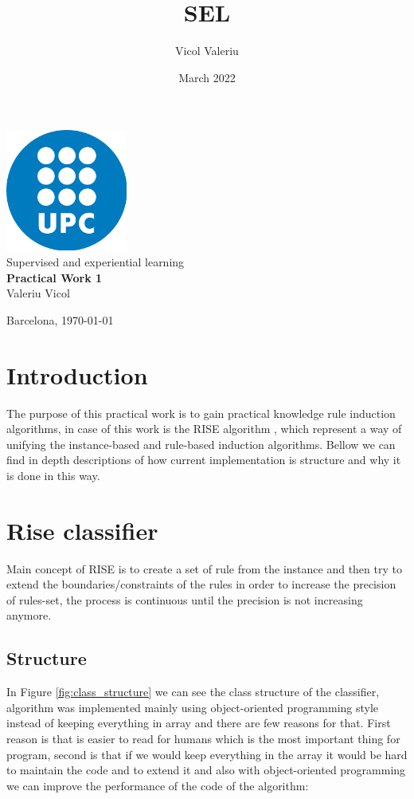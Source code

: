 \documentclass{article}
\title{SEL}
\author{Vicol Valeriu}
\date{March 2022}
\begin{document}
% 

\begin{titlepage}
    \centering
   \sc \LARGE
   \vspace{3cm}
   \includegraphics[height=4cm,width=4cm]{media/logo.png}\\
   \vspace{1cm}
   Supervised and experiential learning\\ 

   \vfill
   \textbf{Practical Work 1}\\

   \vspace{2cm}
   \Large \vfill
   Valeriu Vicol 
   
   \vfill
 
  Barcelona, \today
\end{titlepage}
\thispagestyle{empty}
\tableofcontents
\vfill
\vspace{.75cm}
\setcounter{page}{1}
\newpage
\section{Introduction}
The purpose of this practical work is to gain practical knowledge  rule induction algorithms, in case of this work is the RISE
algorithm \cite{domingos1996unifying}, which represent a way of unifying the instance-based and rule-based induction
algorithms. Bellow we can find in depth descriptions of how current implementation is structure and why it is done in this way.
\section{Rise classifier}
Main concept of RISE is to create a set of rule from the instance and then try to extend the boundaries/constraints of the rules
in order to increase the precision of rules-set, the process is continuous until the precision is not increasing anymore.

\subsection{Structure}
In Figure \ref{fig:class_structure} we can see the class structure of the classifier, algorithm was implemented mainly 
using object-oriented programming \cite{rentsch1982object} style instead of keeping everything in array and there are few reasons for that. First
reason is that is easier to read for humans which is the most important thing for program, second is that if we would keep everything
in the array it would be hard to maintain the code and to extend it and also with object-oriented programming we can improve the 
performance of the code of the algorithm: 
\end{document}

